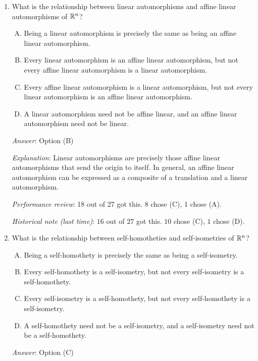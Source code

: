 \documentclass[10pt]{amsart}
\begin{document}
\begin{enumerate}
\item What is the relationship between linear automorphisms and affine
  linear automorphisms of $\mathbb{R}^n$?

  \begin{enumerate}[(A)]
  \item Being a linear automorphism is precisely the same as being an
    affine linear automorphism.
  \item Every linear automorphism is an affine linear automorphism,
    but not every affine linear automorphism is a linear automorphism.
  \item Every affine linear automorphism is a linear automorphism, but
    not every linear automorphism is an affine linear automorphism.
  \item A linear automorphism need not be affine linear, and an affine
    linear automorphism need not be linear.
  \end{enumerate}

  {\em Answer}: Option (B)

  {\em Explanation}: Linear automorphisms are precisely those affine
  linear automorphisms that send the origin to itself. In general, an
  affine linear automorphism can be expressed as a composite of a
  translation and a linear automorphism.

  {\em Performance review}: 18 out of 27 got this. 8 chose (C), 1 chose (A).

  {\em Historical note (last time)}: $16$ out of $27$ got this. $10$ chose (C),
  $1$ chose (D).

\item What is the relationship between self-homotheties and
  self-isometries of $\mathbb{R}^n$?

  \begin{enumerate}[(A)]
  \item Being a self-homothety is precisely the same as being a
    self-isometry.
  \item Every self-homothety is a self-isometry, but not every
    self-isometry is a self-homothety.
  \item Every self-isometry is a self-homothety, but not every
    self-homothety is a self-isometry.
  \item A self-homothety need not be a self-isometry, and a
    self-isometry need not be a self-homothety.
  \end{enumerate}

  {\em Answer}: Option (C)


\end{enumerate}
\end{document}
